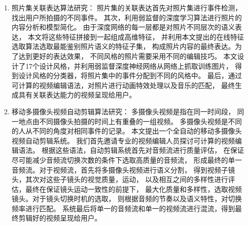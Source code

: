 \begin{enumerate}[{(1)}]
    \item 照片集关联表达算法研究：
        照片集的关联表达首先对照片集进行事件检测，找出用户所拍摄的不同事件。
        其次，利用弱监督的深度学习算法进行照片的内容分析和模型简化。
        由于深度网络的每一层都是对照片不同层次的语义表达，
        本文将这些特征拼接到一起组成高维特征，
        并利用本文提出的在线特征选取算法选取最能鉴别照片语义的特征子集，
        构成照片内容的最终表达。为了达到更好的表达效果，
        不同风格的照片需要采用不同的编辑技巧。
        本文设计了17个设计风格，并利用弱监督深度神经网络从网络上抓取训练图片，
        得到设计风格的分类器，将照片集中的事件分配到不同的风格中。
        最后，通过可计算的视频编辑语法，对照片进行动画特效处理以及音乐的匹配，
        最终生成具有关联表达能力的视频呈现给用户。

    \item 移动多摄像头视频自动剪辑算法研究：
        多摄像头视频是指在同一时间段，
        同一地点由不同摄像头拍摄的时间上有重叠的一组视频。
        多摄像头视频是不同的人从不同的角度对相同事件的记录。
        本文提出一个全自动的移动多摄像头视频自动剪辑系统。
        我们首先邀请专业的视频编辑人员探讨可计算的视频编辑语法。
        根据这些语法，自动剪辑系统首先对音频流进行质量评估，
        在保证尽可能减少音频流切换次数的条件下选取高质量的音频流，
        形成最终的单一音频流。对于视频流，首先将多摄像头视频进行语义分割，
        得到视频子镜头，其次对这些子镜头的视觉质量，运动，
        以及相互之间的多样性进行评估，最终在保证镜头运动一致性的前提下，
        最大化质量和多样性，选取视频镜头。对于镜头切换时机的选取，
        则根据音频的节奏以及语义特性，对切换频率进行匹配。
        系统最后将单一的音频流和单一的视频流进行混流，得到最终剪辑好的视频呈现给用户。
\end{enumerate}

